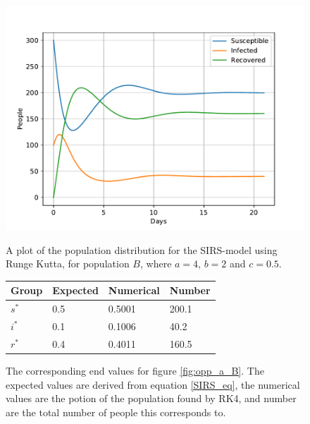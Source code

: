 \documentclass[a4paper]{article}
\begin{document}
	\begin{figure}[!htb]
		\centering
		\begin{minipage}{0.49\textwidth}
			\centering
			\includegraphics[scale=0.6]{../plots/opp_a_B.pdf}
			\caption{A plot of the population distribution for the SIRS-model using Runge Kutta, for population $B$, where $a=4$, $b=2$ and $c=0.5$. }\label{fig:opp_a_B}
		\end{minipage}
		\begin{minipage}{0.49\textwidth}
			\centering
			\captionsetup{type=table} %
			\begin{tabular}{|l|l|l|l|}
				\hline
				Group & Expected & Numerical   & Number  \\ \hline
				$s^*$ & 0.5 & 0.5001 & 200.1 \\ \hline
				$i^*$ & 0.1 & 0.1006 & 40.2 \\ \hline
				$r^*$ & 0.4 & 0.4011 & 160.5 \\ \hline
			\end{tabular}
			\caption{The corresponding end values for figure \ref{fig:opp_a_B}. The expected values are derived from equation \ref{SIRS_eq}, the numerical values are the potion of the population found by RK4, and number are the total number  of people this corresponds to.}\label{tab:opp_a_B}
		\end{minipage}
	\end{figure}
	
\end{document}
